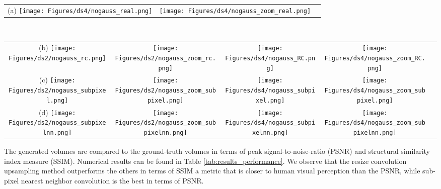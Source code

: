\documentclass{article}
\begin{document}
\begin{figure*}
\begin{tabular}{ccc}
(a)
{\texttt{[image: Figures/ds4/nogauss\_real.png]}} &
{\texttt{[image: Figures/ds4/nogauss\_zoom\_real.png]}} \\
\end{tabular}
\\
\begin{tabular}{ccccc}
(b)
{\texttt{[image: Figures/ds2/nogauss\_rc.png]}} &
{\texttt{[image: Figures/ds2/nogauss\_zoom\_rc.png]}} &
{\texttt{[image: Figures/ds4/nogauss\_RC.png]}} &
{\texttt{[image: Figures/ds4/nogauss\_zoom\_RC.png]}}\\
(c)
{\texttt{[image: Figures/ds2/nogauss\_subpixel.png]}} &
{\texttt{[image: Figures/ds2/nogauss\_zoom\_subpixel.png]}} &
{\texttt{[image: Figures/ds4/nogauss\_subpixel.png]}} &
{\texttt{[image: Figures/ds4/nogauss\_zoom\_subpixel.png]}}\\

(d)
{\texttt{[image: Figures/ds2/nogauss\_subpixelnn.png]}} &
{\texttt{[image: Figures/ds2/nogauss\_zoom\_subpixelnn.png]}} &
{\texttt{[image: Figures/ds4/nogauss\_subpixelnn.png]}} &
{\texttt{[image: Figures/ds4/nogauss\_zoom\_subpixelnn.png]}}\\
\end{tabular}
\caption{Illustration of SR results (zoom-ins of the blue region) using downsampling factors 2 (left) and 4 (right). Original image (a), resize convolution (b), subpixel (c), subpixel-NN (d) upsampling}
\label{fig:comparison-visual}
\end{figure*}



The generated volumes are compared to the ground-truth volumes in terms of peak signal-to-noise-ratio (PSNR) and structural similarity index measure (SSIM). Numerical results can be found in Table \ref{tab:results_performance}. We observe that the resize convolution upsampling method outperforms the others in terms of SSIM a metric that is closer to human visual perception than the PSNR, while sub-pixel nearest neighbor convolution is the best in terms of PSNR.
\end{document}
